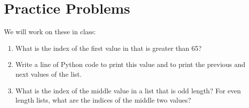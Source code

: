 \documentclass[letterpaper,10pt,english]{sphinxmanual}
\begin{document}
\section{Practice Problems}
\label{\detokenize{lecture_notes/lec08_lists1:practice-problems}}
We will work on these in class:
\begin{enumerate}
\item {} 
What is the index of the first value in  that is
greater than 65?

\item {} 
Write a line of Python code to print this value and to print the
previous and next values of the list.

\item {} 
What is the index of the middle value in a list that is odd length?
For even length lists, what are the indices of the middle two values?

\end{enumerate}
\end{document}

